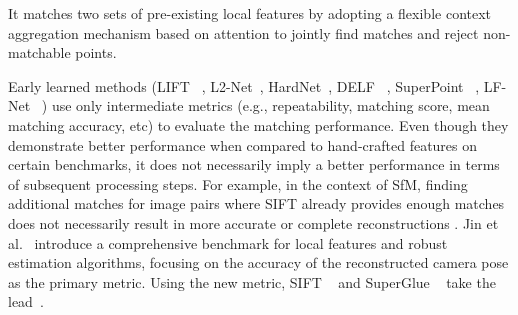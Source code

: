 It matches two sets of pre-existing local features by adopting a flexible context aggregation mechanism based on attention to jointly find matches and reject non-matchable points.
\par
Early learned methods (LIFT ~\cite{yi2016lift}, L2-Net~\cite{tian2017l2}, HardNet~\cite{mishchuk2017working}, DELF ~\cite{noh2017DELF}, SuperPoint ~\cite{detone2018superpoint}, LF-Net ~\cite{ono2018lf}) use only intermediate metrics (e.g., repeatability, matching score, mean matching accuracy, etc) to evaluate the matching performance. 
Even though they demonstrate better performance when compared to hand-crafted features on certain benchmarks, it does not necessarily imply a better performance in terms of subsequent processing steps. For example, in the context of \ac{SfM}, finding additional matches for image pairs where SIFT already provides enough matches does not necessarily result in more accurate or complete reconstructions \cite{schonberger2017comparative}.
Jin et al.~\cite{jin2020image} introduce a comprehensive benchmark for local features and robust estimation algorithms, focusing on the accuracy of the reconstructed camera pose as the primary metric. Using the new metric, SIFT ~\cite{lowe2004distinctive} and SuperGlue ~\cite{sarlin2020superglue} take the lead~\cite{imagematchingchallenge2020}.


